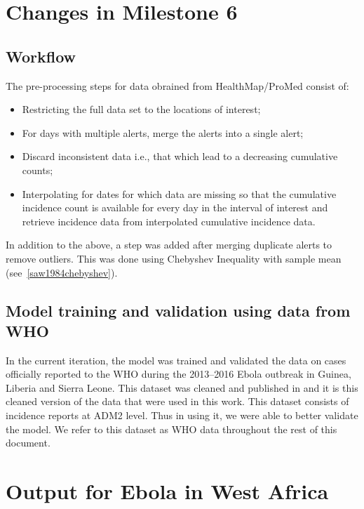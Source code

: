 \documentclass[11pt,]{article}
\begin{document}
\section{Changes in Milestone 6}\label{changes-in-milestone-6}

\hypertarget{workflow}{\subsection{Workflow}\label{workflow}}

The pre-processing steps for data obrained from HealthMap/ProMed consist
of:
\begin{itemize}
\item Restricting the full data set to the locations of interest;
\item For days with multiple alerts, merge the alerts into a single
  alert;
\item Discard inconsistent data i.e., that which lead to a decreasing
  cumulative counts;
\item Interpolating for dates for which data are missing
so that the cumulative incidence count is available for every day in the
interval of interest and retrieve incidence data from interpolated
cumulative incidence data.
\end{itemize}

In addition to the above, a step was added after merging duplicate
alerts to remove outliers. This was done using Chebyshev Inequality
with sample mean (see~\ref{saw1984chebyshev}). 

\subsection{Model training and validation using data from
WHO}\label{model-training-and-validation-using-data-from-who}

In the current iteration, the model was trained and validated the data
on cases officially reported to the WHO during the 2013--2016 Ebola
outbreak in Guinea, Liberia and Sierra Leone. This dataset was cleaned
and published in \citep{garske20160308} and it is this cleaned version
of the data that were used in this work. This dataset consists of
incidence reports at ADM2 level. Thus in using it, we were able to
better validate the model. We refer to this dataset as WHO data
throughout the rest of this document.

\section{Output for Ebola in West
Africa}\label{output-for-ebola-in-west-africa}
\end{document}
